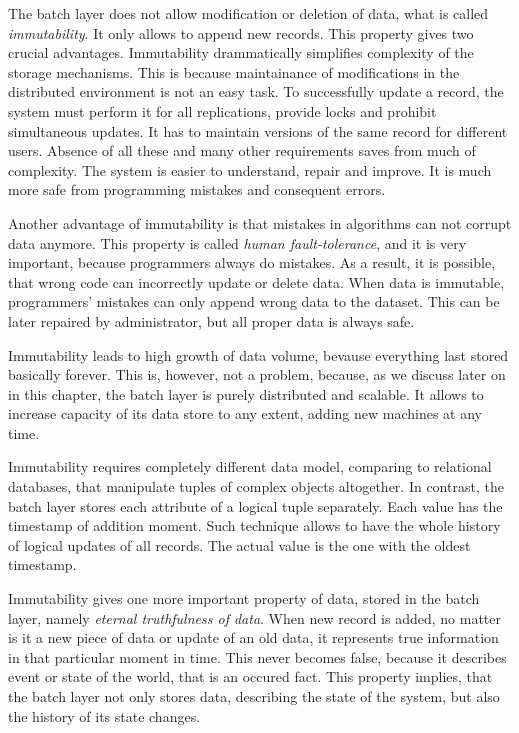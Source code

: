 The batch layer does not allow modification or deletion of data, what is called \textit{immutability}.
It only allows to append new records.
This property gives two crucial advantages.
Immutability drammatically simplifies complexity of the storage mechanisms.
This is because maintainance of modifications in the distributed environment is not an easy task.
To successfully update a record, the system must perform it for all replications, provide locks and prohibit simultaneous updates.
It has to maintain versions of the same record for different users.
Absence of all these and many other requirements saves from much of complexity.
The system is easier to understand, repair and improve.
It is much more safe from programming mistakes and consequent errors.

Another advantage of immutability is that mistakes in algorithms can not corrupt data anymore.
This property is called \textit{human fault-tolerance}, and it is very important, because programmers always do mistakes.
As a result, it is possible, that wrong code can incorrectly update or delete data.
When data is immutable, programmers' mistakes can only append wrong data to the dataset.
This can be later repaired by administrator, but all proper data is always safe.

Immutability leads to high growth of data volume, bevause everything last stored basically forever.
This is, however, not a problem, because, as we discuss later on in this chapter, the batch layer is purely distributed and scalable.
It allows to increase capacity of its data store to any extent, adding new machines at any time.

Immutability requires completely different data model, comparing to relational databases, that manipulate tuples of complex objects altogether.
In contrast, the batch layer stores each attribute of a logical tuple separately.
Each value has the timestamp of addition moment. 
Such technique allows to have the whole history of logical updates of all records.
The actual value is the one with the oldest timestamp.

Immutability gives one more important property of data, stored in the batch layer, namely \textit{eternal truthfulness of data}.
When new record is added, no matter is it a new piece of data or update of an old data, it represents true information in that particular moment in time.
This never becomes false, because it describes event or state of the world, that is an occured fact.
This property implies, that the batch layer not only stores data, describing the state of the system, but also the history of its state changes.

